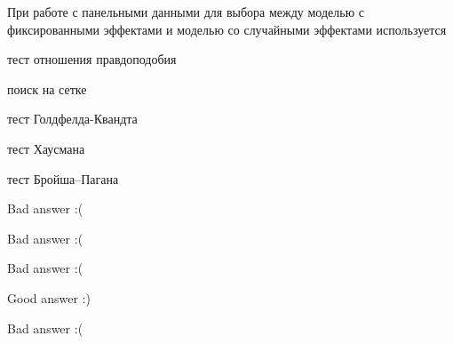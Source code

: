 
\begin{question}
При работе с панельными данными для выбора между моделью с фиксированными эффектами и моделью со случайными эффектами используется
\begin{answerlist}
  \item тест отношения правдоподобия
  \item поиск на сетке
  \item тест Голдфелда-Квандта
  \item тест Хаусмана
  \item тест Бройша--Пагана
\end{answerlist}
\end{question}

\begin{solution}
\begin{answerlist}
  \item Bad answer :(
  \item Bad answer :(
  \item Bad answer :(
  \item Good answer :)
  \item Bad answer :(
\end{answerlist}
\end{solution}


